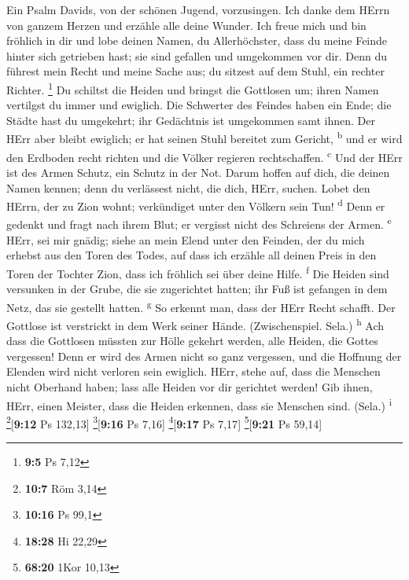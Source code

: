  Ein Psalm Davids, von der schönen Jugend, vorzusingen.
 Ich danke dem HErrn von ganzem Herzen und erzähle alle
deine Wunder.  Ich freue mich und bin fröhlich in dir und
lobe deinen Namen, du Allerhöchster,  dass du meine Feinde
hinter sich getrieben hast; sie sind gefallen und umgekommen vor dir.
 Denn du führest mein Recht und meine Sache aus; du
sitzest auf dem Stuhl, ein rechter Richter. \footnote{\textbf{9:5} Ps
  7,12}  Du schiltst die Heiden und bringst die Gottlosen
um; ihren Namen vertilgst du immer und ewiglich.  Die
Schwerter des Feindes haben ein Ende; die Städte hast du umgekehrt; ihr
Gedächtnis ist umgekommen samt ihnen.  Der HErr aber
bleibt ewiglich; er hat seinen Stuhl bereitet zum Gericht,
\textsuperscript{b}  und er wird den Erdboden recht
richten und die Völker regieren rechtschaffen. \textsuperscript{c}
 Und der HErr ist des Armen Schutz, ein Schutz in der
Not.  Darum hoffen auf dich, die deinen Namen kennen;
denn du verlässest nicht, die dich, HErr, suchen.  Lobet
den HErrn, der zu Zion wohnt; verkündiget unter den Völkern sein Tun!
\textsuperscript{d}  Denn er gedenkt und fragt nach ihrem
Blut; er vergisst nicht des Schreiens der Armen. \textsuperscript{e}
 HErr, sei mir gnädig; siehe an mein Elend unter den
Feinden, der du mich erhebst aus den Toren des Todes, 
auf dass ich erzähle all deinen Preis in den Toren der Tochter Zion,
dass ich fröhlich sei über deine Hilfe. \textsuperscript{f}
 Die Heiden sind versunken in der Grube, die sie
zugerichtet hatten; ihr Fuß ist gefangen in dem Netz, das sie gestellt
hatten. \textsuperscript{g}  So erkennt man, dass der
HErr Recht schafft. Der Gottlose ist verstrickt in dem Werk seiner
Hände. (Zwischenspiel. Sela.) \textsuperscript{h}  Ach
dass die Gottlosen müssten zur Hölle gekehrt werden, alle Heiden, die
Gottes vergessen!  Denn er wird des Armen nicht so ganz
vergessen, und die Hoffnung der Elenden wird nicht verloren sein
ewiglich.  HErr, stehe auf, dass die Menschen nicht
Oberhand haben; lass alle Heiden vor dir gerichtet werden!
 Gib ihnen, HErr, einen Meister, dass die Heiden
erkennen, dass sie Menschen sind. (Sela.) \textsuperscript{i}
\footnote{\textbf{10:7} Röm 3,14}{[}\textbf{9:12} Ps 132,13{]}
\footnote{\textbf{10:16} Ps 99,1}{[}\textbf{9:16} Ps 7,16{]}
\footnote{\textbf{18:28} Hi 22,29}{[}\textbf{9:17} Ps 7,17{]}
\footnote{\textbf{68:20} 1Kor 10,13}{[}\textbf{9:21} Ps 59,14{]}


